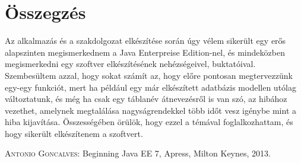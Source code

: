\documentclass[centeredchapter]{thesis-ekf}
\theoremstyle{definition}
\theoremstyle{remark}
\begin{document}



\chapter{Összegzés}

Az alkalmazás és a szakdolgozat elkészítése során úgy vélem sikerült egy erős alapszinten megismerkednem a Java Enterpreise Edition-nel, és mindeközben megismerkedni egy szoftver elkészítésének nehézségeivel, buktatóival. Szembesültem azzal, hogy sokat számít az, hogy előre pontosan megtervezzünk egy-egy funkciót, mert ha például egy már elkészített adatbázis modellen utólag változtatunk, és még ha csak egy táblanév átnevezésről is van szó, az hibához vezethet, amelynek megtalálása nagyságrendekkel több időt vesz igénybe mint a hiba kijavítása.
Összességében örülök, hogy ezzel a témával foglalkozhattam, és hogy sikerült elkészítenem a szoftvert.


\begin{thebibliography}{1}
 \textsc{Antonio Goncalves}: Beginning Java EE 7, Apress, Milton Keynes, 2013.
\end{thebibliography}
\end{document}
